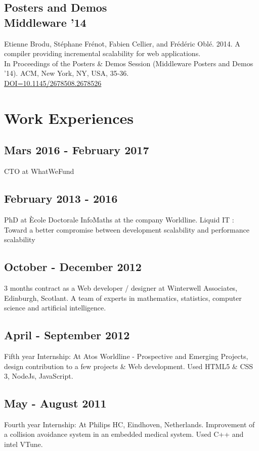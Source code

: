	\subsection{Posters and Demos\\Middleware '14}{
		Etienne Brodu, Stéphane Frénot, Fabien Cellier, and Frédéric Oblé. 2014.
		A compiler providing incremental scalability for web applications.\\
		In Proceedings of the Posters \& Demos Session (Middleware Posters and Demos '14).
		ACM, New York, NY, USA, 35-36.\\
		\href{http://doi.acm.org/10.1145/2678508.2678526}{DOI=10.1145/2678508.2678526}
	}

\section{Work Experiences}

	\subsection{Mars 2016 - February 2017}
		{CTO at WhatWeFund}

	\subsection{February 2013 - 2016}
		{PhD at Ècole Doctorale InfoMaths at the company Worldline. Liquid IT : Toward a better compromise between development scalability and performance scalability}

	\subsection{October - December 2012}
		{3 months contract as a Web developer / designer at Winterwell Associates, Edinburgh, Scotlant. A team of experts in mathematics, statistics, computer science and artificial intelligence.}

	\subsection{April - September 2012}
		{Fifth year Internship: At Atos Worldline - Prospective and Emerging Projects, design contribution to a few projects \& Web development. Used HTML5 \& CSS 3, NodeJs, JavaScript.}

	\subsection{May - August 2011}
		{Fourth year Internship: At Philips HC, Eindhoven, Netherlands. Improvement of a collision avoidance system in an embedded medical system. Used C++ and intel VTune.}

